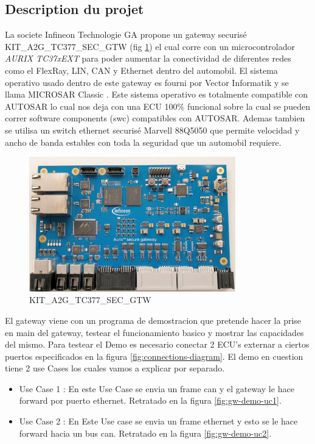 \subsection{Description du projet}
La societe Infineon Technologie GA propone un gateway securis\'e KIT\_A2G\_TC377\_SEC\_GTW \cite{gateway} (fig \ref{fig:gw-photo}) el cual corre con un microcontrolador \textit{AURIX TC37xEXT} para poder aumentar la conectividad de diferentes redes como el FlexRay, LIN, CAN y Ethernet dentro del automobil. El sistema operativo usado dentro de este gateway es fourni por Vector Informatik y se llama MICROSAR Classic \cite{vector.microsar}. Este sistema operativo es totalmente compatible con AUTOSAR lo cual nos deja con una ECU 100\% funcional sobre la cual se pueden correr software components (swc) compatibles con AUTOSAR. Ademas tambien se utilisa un switch ethernet securis\'e Marvell 88Q5050 que permite velocidad y ancho de banda estables con toda la seguridad que un automobil requiere.

\begin{figure}[!htb]
 \centering
 \includegraphics[width=0.8\textwidth]{img/secure-gateway.jpg}
 \caption{KIT\_A2G\_TC377\_SEC\_GTW}
 \label{fig:gw-photo}
\end{figure}

El gateway viene con un programa de demostracion que pretende hacer la prise en main del gateway, testear el funcionamiento basico y mostrar las capacidades del mismo. Para testear el Demo es necesario conectar 2 ECU's externar a ciertos puertos especificados en la figura \ref{fig:connections-diagram}. El demo en cuestion tiene 2 use Cases los cuales vamos a explicar por separado.

\begin{itemize}
    \item Use Case 1 : En este Use Case se envia un frame can y el gateway le hace forward por puerto ethernet. Retratado en la figura \ref{fig:gw-demo-uc1}.
    \item Use Case 2 : En Este Use case se envia un frame ethernet y esto se le hace forward hacia un bus can. Retratado en la figura \ref{fig:gw-demo-uc2}.
\end{itemize}

